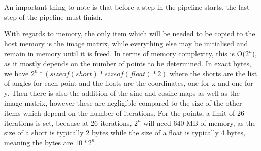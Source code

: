An important thing to note is that before a step in the pipeline starts, the last step of the pipeline must finish.

With regards to memory, the only item which will be needed to be copied to the host memory is the image matrix, while everything else may be initialised and remain in memory until it is freed. In terms of memory complexity, this is O($2^n$), as it mostly depends on the number of points to be determined. In exact bytes, we have $2^n * (sizeof(short) * sizeof(float) * 2)$ where the shorts are the list of angles for each point and the floats are the coordinates, one for x and one for y. Then there is also the addition of the sine and cosine maps as well as the image matrix, however these are negligible compared to the size of the other items which depend on the number of iterations. For the points, a limit of 26 iterations is set, because at 26 iterations, $2^n$ will need 640 MB of memory, as the size of a short is typically 2 bytes while the size of a float is typically 4 bytes, meaning the bytes are $10*2^n$.